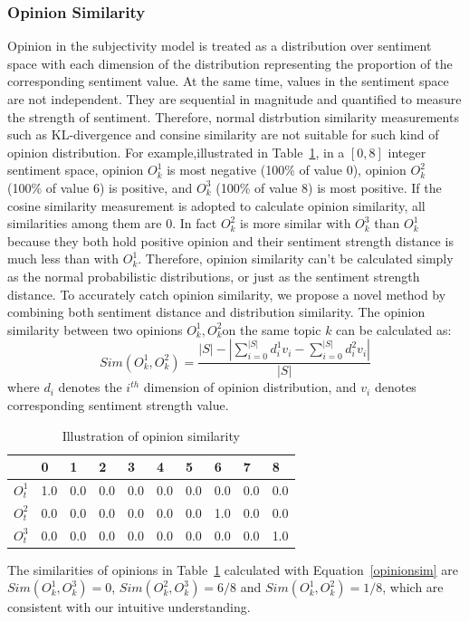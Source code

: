 \documentclass[letterpaper]{article}
\begin{document}
\subsubsection{Opinion Similarity}
\label{opsim}

Opinion in the subjectivity model is treated  as a distribution over sentiment space with each dimension of the distribution representing the proportion of the corresponding sentiment value. 
At the same time, values in the sentiment space are not independent. 
They are sequential in magnitude and quantified to measure the strength of sentiment. Therefore, normal distrbution similarity measurements such as KL-divergence and consine similarity are not suitable for such kind of opinion distribution. For example,illustrated in Table~\ref{tab1}, in a $ [0,8 ] $ integer sentiment space, opinion $ O_{k}^{1} $ is most negative (100\% of value 0), opinion $ O_{k}^{2} $ (100\% of value 6) is positive, and $ O_{k}^{3} $ (100\% of value 8) is most positive.
If the cosine similarity measurement is adopted to calculate opinion similarity, all similarities among them are 0.
In fact $ O_{k}^{2} $ is more similar with $ O_{k}^{3} $ than $O_{k}^{1} $ because they both hold positive opinion and their sentiment strength distance is much less than with $ O_{k}^{1} $.  
Therefore, opinion similarity can't be calculated simply as the normal probabilistic distributions, or just as the sentiment strength distance. 
To accurately catch opinion similarity, we propose a novel method by combining both sentiment distance and distribution similarity.
The opinion similarity between two opinions $O_{k}^{1},O_{k}^{2} $on the same topic $ k $ can be calculated as: 
\begin{equation}
\label{opinionsim}
Sim(O_{k}^{1},O_{k}^{2})=\dfrac{|S|-|\sum_{i=0}^{|S|}d_{i}^{1}v_{i}-\sum_{i=0}^{|S|}d_{i}^{2}v_{i}|}{|S|}
\end{equation}
where $ d_{i} $ denotes the $ i^{th} $ dimension of opinion distribution, and $ v_{i} $ denotes corresponding sentiment strength value. 
\begin{table}[htb]
\scriptsize
\centering
\caption{Illustration of opinion similarity}
\label{tab1}
\begin{tabular}{|l|l|l|l|l|l|l|l|l|l|}
\hline
 & 0 & 1& 2 & 3 & 4 & 5 & 6 & 7 & 8 \\
\hline
$O_{t}^{1}$ & 1.0 & 0.0 & 0.0 & 0.0 & 0.0 & 0.0 & 0.0 & 0.0 & 0.0 \\
\hline
$O_{t}^{2}$ & 0.0 & 0.0 & 0.0 & 0.0 & 0.0 & 0.0 & 1.0 & 0.0 & 0.0 \\
\hline
$O_{t}^{3}$ & 0.0 & 0.0 & 0.0 & 0.0 & 0.0 & 0.0 & 0.0 & 0.0 & 1.0 \\
\hline
\end{tabular}
\end{table} 
The similarities of opinions in Table~\ref{tab1} calculated with Equation~\ref{opinionsim} are $ Sim(O_{k}^{1},O_{k}^{3})=0 $, $ Sim(O_{k}^{2},O_{k}^{3})=6/8 $ and $ Sim(O_{k}^{1},O_{k}^{2})=1/8 $, which are consistent with our intuitive understanding. 
\end{document}
